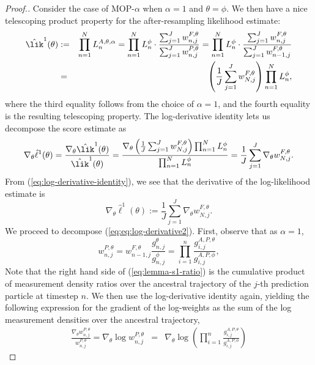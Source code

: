 \begin{proof}[Proof.]
    Consider the case of MOP-$\alpha$ when $\alpha=1$ and $\theta=\phi$. We then have a nice telescoping product property for the after-resampling likelihood estimate:
\begin{eqnarray}
    \hat{\lik}^1(\theta) &:=& \prod_{n=1}^N L_n^{A, \theta, \alpha} = \prod_{n=1}^N L_n^\phi \cdot \frac{\sum_{j=1}^J w_{n,j}^{F,\theta}}{\sum_{j=1}^J w_{n,j}^{P,\theta}}= \prod_{n=1}^N L_n^\phi \cdot \frac{\sum_{j=1}^J w_{n,j}^{F,\theta}}{\sum_{j=1}^J w_{n-1,j}^{F,\theta}} \nonumber
\\
&=& \left(\frac{1}{J}\sum_{j=1}^J w_{N,j}^{F,\theta}\right) \prod_{n=1}^N L_n^\phi,
\end{eqnarray}
where the third equality follows from the choice of $\alpha=1$, and the fourth equality is the resulting telescoping property. 
The log-derivative identity lets us decompose the score estimate as
\begin{equation}\label{eq:log-derivative-identity}
\nabla_\theta \hat\ell^1(\theta) = \frac{\nabla_\theta \hat\lik^1(\theta)}{\hat\lik^1(\theta)} = \frac{\nabla_\theta\left(\frac{1}{J}\sum_{j=1}^J w_{N,j}^{F,\theta}\right) \prod_{n=1}^N L_n^\phi}{\prod_{n=1}^N L_n^\phi} =  \frac{1}{J}\sum_{j=1}^J \nabla_\theta w_{N,j}^{F,\theta}.
\end{equation}
From (\ref{eq:log-derivative-identity}), we see that the derivative of the log-likelihood estimate is
\begin{equation}\label{eq:eq:log-derivative2}
    \nabla_\theta \hat{\ell}^1(\theta) := \frac{1}{J}\sum_{j=1}^J \nabla_\theta w_{N,j}^{F,\theta}.
\end{equation}
We proceed to decompose (\ref{eq:eq:log-derivative2}).
First, observe that as $\alpha=1$,
\begin{equation}\label{eq:lemma-s1-ratio}
w_{n,j}^{P,\theta} = w_{n-1,j}^{F,\theta}\frac{g_{n,j}^\theta}{g_{n,j}^\phi} = \prod_{i=1}^n \frac{g_{i,j}^{A,P,\theta}}{g_{i,j}^{A,P,\phi}},
\end{equation}
Note that the right hand side of (\ref{eq:lemma-s1-ratio}) is the cumulative product of measurement density ratios over the ancestral trajectory of the $j$-th prediction particle at timestep $n$.
We then use the log-derivative identity again, yielding the following expression for the gradient of the log-weights as the sum of the log measurement densities over the ancestral trajectory,
\begin{eqnarray}
 \frac{\nabla_\theta w_{n,j}^{P,\theta}}{w_{n,j}^{P,\theta}} = \nabla_\theta \log w_{n,j}^{P,\theta} &=& \nabla_\theta \log \left(\prod_{i=1}^n \frac{g_{i,j}^{A,P,\theta}}{g_{i,j}^{A,P,\phi}}\right) 

\end{eqnarray}
\end{proof}
